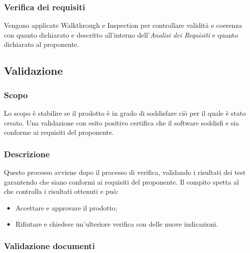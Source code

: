 \subsubsection{Verifica dei requisiti}
Vengono applicate Walkthrough e Inspection per controllare validità e coerenza con quanto dichiarato e descritto all'interno dell'\textit{Analisi dei Requisiti} e quanto dichiarato al proponente.

\subsection{Validazione}
\subsubsection{Scopo}
Lo scopo è stabilire se il prodotto è in grado di soddisfare ciò per il quale è stato creato. Una validazione con esito positivo certifica che il software soddisfi e sia conforme ai requisiti del proponente.

\subsubsection{Descrizione}
Questo processo avviene dopo il processo di verifica, validando i risultati dei test garantendo che siano conformi ai requisiti del proponente. Il compito spetta al \RE che controlla i risultati ottenuti e può:
\begin{itemize}
\item Accettare e approvare il prodotto;
\item Rifiutare e chiedere un'ulteriore verifica con delle nuove indicazioni.
\end{itemize}

\subsubsection{Validazione documenti}

